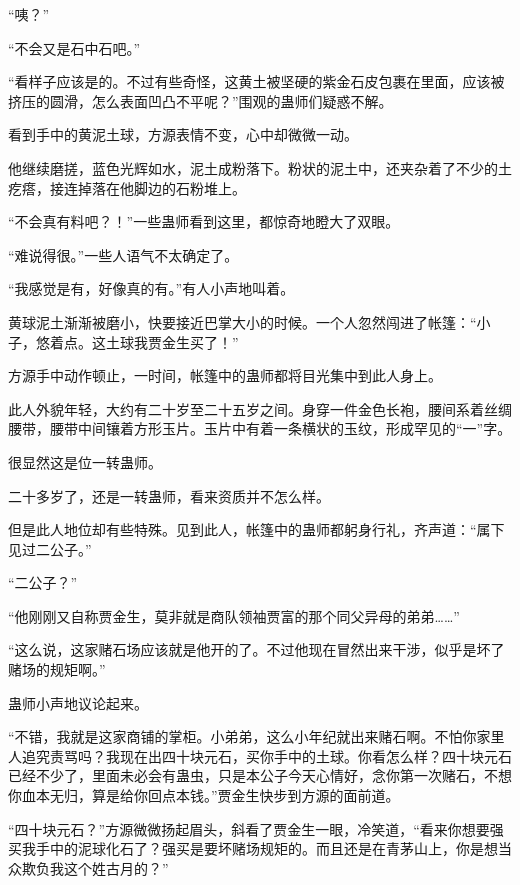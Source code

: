 
\begin{this_body}



“咦？”

“不会又是石中石吧。”

“看样子应该是的。不过有些奇怪，这黄土被坚硬的紫金石皮包裹在里面，应该被挤压的圆滑，怎么表面凹凸不平呢？”围观的蛊师们疑惑不解。

看到手中的黄泥土球，方源表情不变，心中却微微一动。

他继续磨搓，蓝色光辉如水，泥土成粉落下。粉状的泥土中，还夹杂着了不少的土疙瘩，接连掉落在他脚边的石粉堆上。

“不会真有料吧？！”一些蛊师看到这里，都惊奇地瞪大了双眼。

“难说得很。”一些人语气不太确定了。

“我感觉是有，好像真的有。”有人小声地叫着。

黄球泥土渐渐被磨小，快要接近巴掌大小的时候。一个人忽然闯进了帐篷：“小子，悠着点。这土球我贾金生买了！”

方源手中动作顿止，一时间，帐篷中的蛊师都将目光集中到此人身上。

此人外貌年轻，大约有二十岁至二十五岁之间。身穿一件金色长袍，腰间系着丝绸腰带，腰带中间镶着方形玉片。玉片中有着一条横状的玉纹，形成罕见的“一”字。

很显然这是位一转蛊师。

二十多岁了，还是一转蛊师，看来资质并不怎么样。

但是此人地位却有些特殊。见到此人，帐篷中的蛊师都躬身行礼，齐声道：“属下见过二公子。”

“二公子？”

“他刚刚又自称贾金生，莫非就是商队领袖贾富的那个同父异母的弟弟……”

“这么说，这家赌石场应该就是他开的了。不过他现在冒然出来干涉，似乎是坏了赌场的规矩啊。”

蛊师小声地议论起来。

“不错，我就是这家商铺的掌柜。小弟弟，这么小年纪就出来赌石啊。不怕你家里人追究责骂吗？我现在出四十块元石，买你手中的土球。你看怎么样？四十块元石已经不少了，里面未必会有蛊虫，只是本公子今天心情好，念你第一次赌石，不想你血本无归，算是给你回点本钱。”贾金生快步到方源的面前道。

“四十块元石？”方源微微扬起眉头，斜看了贾金生一眼，冷笑道，“看来你想要强买我手中的泥球化石了？强买是要坏赌场规矩的。而且还是在青茅山上，你是想当众欺负我这个姓古月的？”


\end{this_body}
